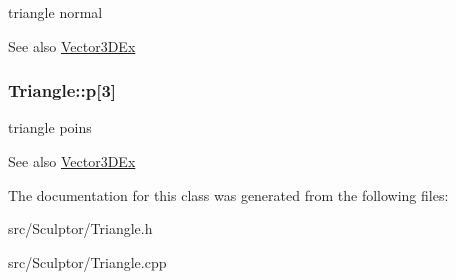 triangle normal 

\begin{DoxySeeAlso}{\-See also}
\hyperlink{class_vector3_d_ex}{\-Vector3\-D\-Ex} 
\end{DoxySeeAlso}
\hypertarget{class_triangle_a9e466f5709e47ed3b7874c09587aab01}{
\subsubsection[{p}]{ {\bf \-Triangle\-::p}\mbox{[}3\mbox{]}}}
\label{class_triangle_a9e466f5709e47ed3b7874c09587aab01}


triangle poins 

\begin{DoxySeeAlso}{\-See also}
\hyperlink{class_vector3_d_ex}{\-Vector3\-D\-Ex} 
\end{DoxySeeAlso}


\-The documentation for this class was generated from the following files\-:\begin{DoxyCompactItemize}
\item 
src/\-Sculptor/\-Triangle.\-h\item 
src/\-Sculptor/\-Triangle.\-cpp\end{DoxyCompactItemize}
